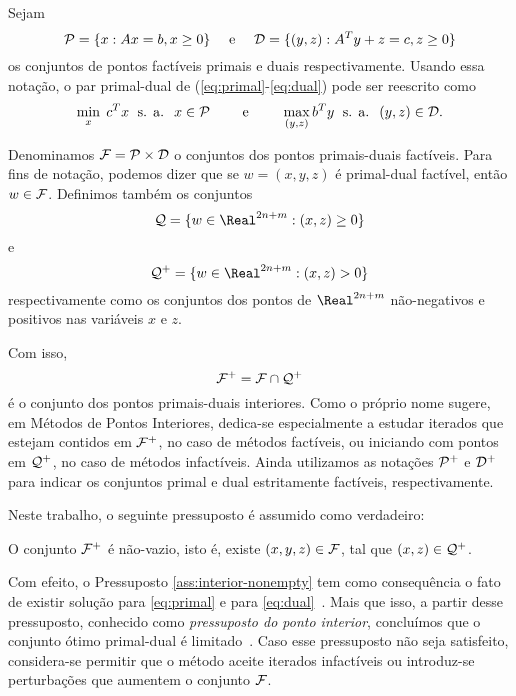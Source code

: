 Sejam
\begin{equation}
\label{eq:primal-dual-feas-set}
\mathcal{P} = \{x : Ax = b, x\geq 0\} \quad\text{ e } \quad
\mathcal{D} = \{ (y, z) : A^Ty + z = c, z\geq 0\}
\end{equation}
 os conjuntos de pontos factíveis primais e duais 
respectivamente. Usando essa notação, o par primal-dual de
(\ref{eq:primal}-\ref{eq:dual}) pode ser reescrito como
\begin{equation}
\label{eq:primal-dual-reescrito}
\min_x\; c^Tx \; \text{ s. a. }\; x\in \mathcal{P} \qquad\text{ e } \qquad
\max_{(y, z)}
b^Ty \; \text{ s. a. }\; (y, z) \in \mathcal{D}.
\end{equation}


Denominamos $\mathcal{F} = \mathcal{P}\times\mathcal{D}$ o conjuntos dos pontos primais-duais
factíveis.
 Para fins de notação, podemos dizer que se  $w = (x, y, z)$ é primal-dual factível, então $w\in\mathcal{F}$. Definimos também os conjuntos \[ \Qset =
 \{w\in\Real^{2n+m}:(x,z)\geq 0\} \] e \[ \Qset^+ = \{w\in\Real^{2n+m}:(x,z) >
 0\} \] respectivamente  como os
conjuntos dos pontos de $\Real^{2n+m}$ não-negativos e positivos nas variáveis
$x$ e $z$.



Com isso, 
\begin{equation}
  	\label{eq:F+}
  	\mathcal{F}^+ = \mathcal{F} \cap \mathcal{Q}^+
  \end{equation}   é o conjunto dos
pontos primais-duais interiores. Como o próprio nome sugere, em Métodos de 
Pontos Interiores, dedica-se especialmente a estudar iterados que estejam
contidos em $\mathcal{F}^+$, no caso de métodos factíveis, ou iniciando com pontos em $\mathcal{Q}^{+}$, no caso de métodos infactíveis. Ainda utilizamos as notações $\mathcal{P}^{+}$ e $\mathcal{D}^{+}$ para indicar os conjuntos primal e dual estritamente factíveis,  respectivamente.


Neste trabalho, o seguinte pressuposto é assumido como verdadeiro:

\begin{pressup}\label{ass:interior-nonempty}
 O conjunto $\mathcal{F}^+$ é não-vazio, isto é, existe $(x,y,z)\in\mathcal{F}$, tal que $(x,z)\in\mathcal{Q}^+$.
\end{pressup}




Com efeito,   o Pressuposto \ref{ass:interior-nonempty} tem como
consequência o fato de existir  solução para
\eqref{eq:primal} e para \eqref{eq:dual}~\cite[Teorema 3.1]{Guler:1995wf}.
Mais que isso, a partir desse pressuposto, conhecido como \emph{pressuposto do
ponto interior}, concluímos que o conjunto ótimo primal-dual  é
limitado~\cite[Lema 2.2]{Guler:1995tn}.  Caso
esse pressuposto não seja satisfeito, considera-se permitir que o método aceite
iterados infactíveis ou introduz-se perturbações que aumentem o conjunto
$\mathcal{F}$.

